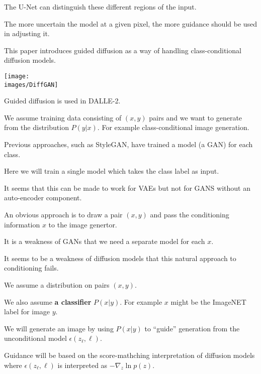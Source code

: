 {\vfill
The U-Net can distinguish these different regions of the input.

\vfill
The more uncertain the model at a given pixel, the more guidance should be used in adjusting it.



This paper introduces guided diffusion as a way of handling class-conditional diffusion models.

\vfill
\centerline{\texttt{[image: \\images/DiffGAN]}}

\vfill
Guided diffusion is used in DALLE-2.


We assume training data consisting of $(x,y)$ pairs and we want to generate from the distribution $P(y|x)$.  For example class-conditional image generation.

\vfill
Previous approaches, such as StyleGAN, have trained a model (a GAN) for each class.

\vfill
Here we will train a single model which takes the class label as input.

\vfill
It seems that this can be made to work for VAEs but not for GANS without an auto-encoder component.


An obvious approach is to draw a pair $(x,y)$ and pass the conditioning information $x$ to the image genertor.

\vfill
It is a weakness of GANs that we need a separate model for each $x$.

\vfill
It seems to be a weakness of diffusion models that this natural approach to conditioning fails.

We assume a distribution on pairs $(x,y)$.

\vfill
We also assume {\bf a classifier} $P(x|y)$.  For example $x$ might be the ImageNET label for image $y$.

\vfill
We will generate an image by using $P(x|y)$ to ``guide'' generation from the unconditional model $\epsilon(z_\ell,\ell)$.

\vfill
Guidance will be based on the score-mathching interpretation of diffusion models where
$\epsilon(z_\ell,\ell)$ is interpreted as $- \nabla_z \ln p(z)$.


}
